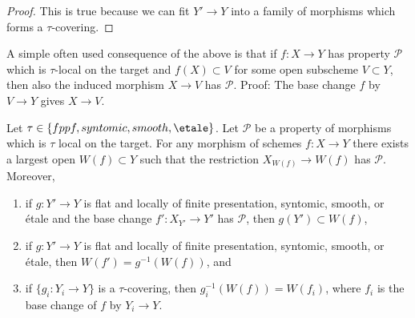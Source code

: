 \begin{proof}
This is true because we can fit $Y' \to Y$ into a family of
morphisms which forms a $\tau$-covering.
\end{proof}

\noindent
A simple often used consequence of the above is that if
$f : X \to Y$ has property $\mathcal{P}$ which is $\tau$-local
on the target and $f(X) \subset V$
for some open subscheme $V \subset Y$, then also the induced
morphism $X \to V$ has $\mathcal{P}$. Proof: The base change
$f$ by $V \to Y$ gives $X \to V$.

\begin{lemma}
\label{lemma-largest-open-of-the-base}
Let $\tau \in \{fppf, syntomic, smooth, \etale\}$.
Let $\mathcal{P}$ be a property of morphisms which is $\tau$ local
on the target. For any morphism of schemes $f : X \to Y$ there exists
a largest open $W(f) \subset Y$ such that the restriction
$X_{W(f)} \to W(f)$ has $\mathcal{P}$. Moreover,
\begin{enumerate}
\item if $g : Y' \to Y$ is flat and locally of finite presentation,
syntomic, smooth, or \'etale and the base change $f' : X_{Y'} \to Y'$
has $\mathcal{P}$, then $g(Y') \subset W(f)$,
\item if $g : Y' \to Y$ is flat and locally of finite presentation,
syntomic, smooth, or \'etale, then $W(f') = g^{-1}(W(f))$, and
\item if $\{g_i : Y_i \to Y\}$ is a $\tau$-covering, then
$g_i^{-1}(W(f)) = W(f_i)$, where $f_i$ is the base change of $f$
by $Y_i \to Y$.
\end{enumerate}
\end{lemma}

